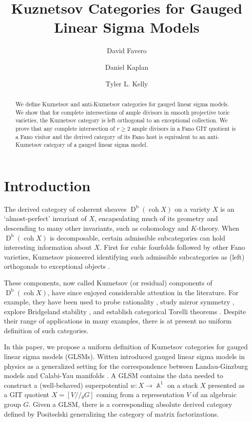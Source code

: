\documentclass[reqno, 12pt]{amsart}
\title[Kuznetsov Categories for GLSMs]{Kuznetsov Categories for Gauged Linear Sigma Models}
\author[Favero]{David Favero}
\author[Kaplan]{Daniel Kaplan}
\author[Kelly]{Tyler L. Kelly}
\theoremstyle{definition}
\newcommand{\op}[1]{\operatorname{#1}}
\newcommand{\modmod}[1]{/ \! \! / \!_{#1}}
\newcommand{\dbcoh}[1]{\operatorname{D}^{\operatorname{b}}(\operatorname{coh }#1)}
\def\A{\op{\mathbb{A}}}
\numberwithin{equation}{section}
\begin{document}
\begin{abstract}
We define Kuznetsov and anti-Kuznetsov categories for gauged linear sigma models. We show that for complete intersections of ample divisors in smooth projective  toric varieties, the Kuznetsov category is left orthogonal to an exceptional collection. We prove that any complete intersection of $r\ge 2$ ample divisors in a Fano GIT quotient is a Fano visitor and the derived category of its Fano host is equivalent to an anti-Kuznetsov category of a gauged linear sigma model.
\end{abstract}

\maketitle
\setcounter{tocdepth}{1}
\vspace{-1cm}
\section{Introduction}

The derived category of coherent sheaves $\dbcoh{X}$ on a variety $X$ is an `almost-perfect' invariant of $X$, encapsulating much of its geometry and descending to many other invariants, such as cohomology and $K$-theory. When $\dbcoh{X}$ is decomposable, certain admissible subcategories can hold interesting information about $X$. First for  cubic fourfolds followed by other Fano varieties, Kuznetsov pioneered identifying such admissible subcategories as (left) orthogonals to exceptional objects \cite{Kuz05, Kuz09, Kuz10, KuzICM}.  

These components, now called  Kuznetsov (or residual) components of $\dbcoh{X}$, have since enjoyed considerable attention in the literature. For example, they have been used to probe rationality \cite{Kuz10, AT}, study mirror symmetry \cite{SheridanSmith}, explore Bridgeland stability \cite{BLMS}, and establish categorical Torelli theorems \cite{BMMS, HR, PS}.  Despite their range of applications in many examples, there is at present no uniform definition of such categories.

In this paper, we propose a uniform definition of Kuznetsov categories for gauged linear sigma models (GLSMs). Witten introduced gauged linear sigma models in physics as a generalized setting for the correspondence between Landau-Ginzburg models and Calabi-Yau manifolds \cite{W93}.  A GLSM contains the data needed to construct a (well-behaved) superpotential $w: X \rightarrow \A^1$ on a stack $X$ presented as a GIT quotient $X = [V\modmod{\theta} G]$ coming from a representation $V$ of an algebraic group $G$. Given a GLSM, there is a corresponding absolute derived category defined by Positselski \cite{P11} generalizing the category of matrix factorizations. 
\end{document}
